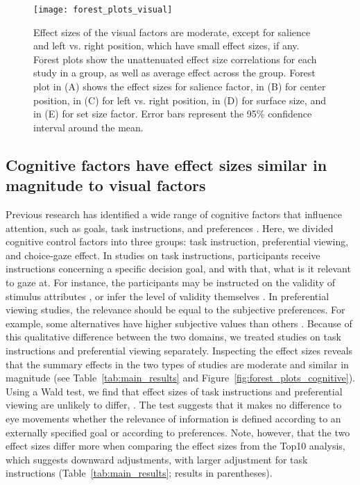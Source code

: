 


\begin{figure}[!h]
\texttt{[image: forest\_plots\_visual]}
\centering
\caption{Effect sizes of the visual factors are moderate, except for salience and left vs. right position, which have small effect sizes, if any. Forest plots show the unattenuated effect size correlations for each study in a group, as well as average effect across the group. Forest plot in (A) shows the effect sizes for salience factor, in (B) for center position, in (C) for left vs. right position, in  (D) for surface size, and in (E) for set size factor. Error bars represent the 95\% confidence interval around the mean.}
\label{fig:forest_plots_visual}
\end{figure}


\subsection{Cognitive factors have effect sizes similar in magnitude to visual factors}

Previous research has identified a wide range of cognitive factors that influence attention, such as goals, task instructions, and preferences \citep[for a review see][]{orquin2013a}. Here, we divided cognitive control factors into three groups: task instruction, preferential viewing, and choice-gaze effect. In studies on task instructions, participants receive instructions concerning a specific decision goal, and with that, what is it relevant to gaze at. For instance, the participants may be instructed on the validity of stimulus attributes \citep{krefeld-schwalb2019a}, or infer the level of validity themselves \citep{bialkova2014a}. In preferential viewing studies, the relevance should be equal to the subjective preferences. For example, some alternatives have higher subjective values than others \citep{kim2012a}. Because of this qualitative difference between the two domains, we treated studies on task instructions and preferential viewing separately. 
Inspecting the effect sizes reveals that the summary effects in the two types of studies are moderate and similar in magnitude (see Table~\ref{tab:main_results} and Figure~\ref{fig:forest_plots_cognitive}). Using a Wald test, we find that effect sizes of task instructions and preferential viewing are unlikely to differ, . 
The test suggests that it makes no difference to eye movements whether the relevance of information is defined according to an externally specified goal or according to preferences. Note, however, that the two effect sizes differ more when comparing the effect sizes from the Top10 analysis, which suggests downward adjustments, with larger adjustment for task instructions (Table~\ref{tab:main_results}; results in parentheses).

